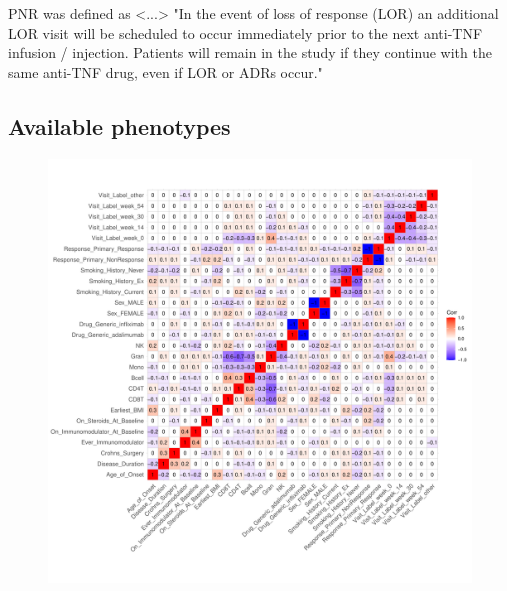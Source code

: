 \begin{outline}
%
\1 \gls{PNR} was defined as <...>
\1 "In the event of loss of response (LOR) an additional LOR visit will be scheduled to occur immediately prior to the next anti-TNF infusion / injection.  Patients will remain in the study if they continue with the same anti-TNF drug, even if LOR or ADRs occur."

\subsection{Available phenotypes}

\begin{figure}
    \centering
    \includegraphics[width=1.0\textwidth,page=1]{mainmatter/figures/chapter_04/process_pheno.pheno_filtered_dge.ggcorrplot.pdf}
    \caption{}
    \label{fig:multipants_pheno_filtered_ggcorrplot}
\end{figure}


\end{outline}

